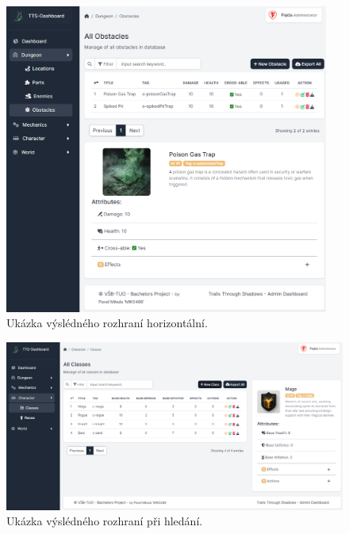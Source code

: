 \begin{figure}[ht]
    \centering
    \includegraphics[width=0.95\textwidth]{figures/dashboardTableHorizontal}
    \caption{Ukázka výslédného rozhraní horizontální.}
    \label{fig:interfaceScreenshotsTableHorizontal}
\end{figure}

\begin{figure}
    \centering
    \includegraphics[width=1.0\textwidth]{figures/dashboardTable}
    \caption{Ukázka výslédného rozhraní při hledání.}
    \label{fig:interfaceScreenshotsTable}
\end{figure}


